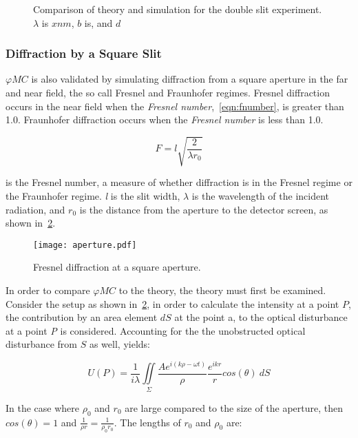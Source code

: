 \begin{figure}[!ht]
    \centering
    \caption{Comparison of theory and simulation for the double slit experiment. $\lambda$ is $x nm$, $b$ is, and $d$}
    \label{fig:doubleslitcomp}
\end{figure}

\subsubsection*{Diffraction by a Square Slit}
$\varphi MC$ is also validated by simulating diffraction from a square aperture in the far and near field, the so call Fresnel and Fraunhofer regimes. 
Fresnel diffraction occurs in the near field when the \textit{Fresnel number},~\cref{eqn:fnumber}, is greater than 1.0.
Fraunhofer diffraction occurs when the \textit{Fresnel number} is less than 1.0.

\begin{equation}
F = l\sqrt{\frac{2}{\lambda r_0}}
\label{eqn:fnumber}
\end{equation}

 is the Fresnel number, a measure of whether diffraction is in the Fresnel regime or the Fraunhofer regime.
\textit{l} is the slit width, $\lambda$ is the wavelength of the incident radiation, and $r_0$ is the distance from the aperture to the detector screen, as shown in~\cref{fig:aperture}. 

\medskip
\begin{figure}[!ht]
    \centering
    \texttt{[image: aperture.pdf]}
    \caption{Fresnel diffraction at a square aperture.}
    \label{fig:aperture}
\end{figure}

In order to compare $\varphi MC$ to the theory, the theory must first be examined.
Consider the setup as shown in~\cref{fig:aperture}, in order to calculate the intensity at a point $P$, the contribution by an area element $dS$ at the point a, to the optical disturbance at a point \textit{P} is considered.
Accounting for the the unobstructed optical disturbance from $S$ as well, yields: 


\begin{equation}
U(P)=\frac{1}{i\lambda}\iint\limits_{\Sigma} \frac{Ae^{i(k\rho-\omega t)}}{\rho} \frac{e^{ikr}}{r}cos(\theta)\ dS
\label{eqn:disturb}
\end{equation}


In the case where $\rho_0$ and $r_0$ are large compared to the size of the aperture, then $cos(\theta) = 1$ and $\tfrac{1}{\rho r}=\tfrac{1}{\rho_0 r_0}$.
The lengths of $r_0$ and $\rho_0$ are:

